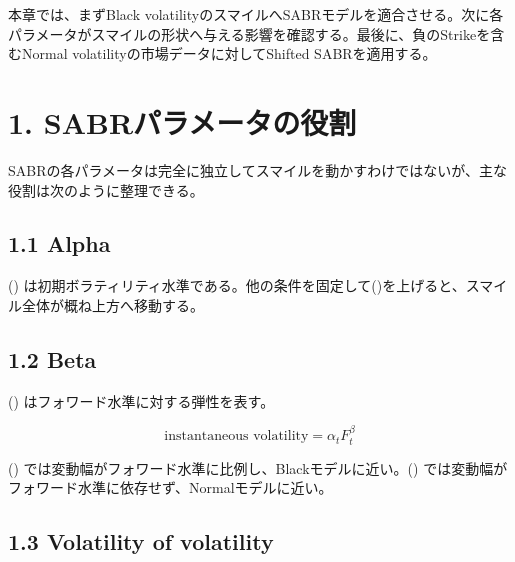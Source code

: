 \documentclass[
  letterpaper,
  DIV=11,
  numbers=noendperiod]{scrreprt}
\newenvironment{Shaded}{\begin{snugshade}}{\end{snugshade}}
\newcommand{\AttributeTok}[1]{\textcolor[rgb]{0.40,0.45,0.13}{#1}}
\newcommand{\ConstantTok}[1]{\textcolor[rgb]{0.56,0.35,0.01}{#1}}
\newcommand{\FunctionTok}[1]{\textcolor[rgb]{0.28,0.35,0.67}{#1}}
\newcommand{\NormalTok}[1]{\textcolor[rgb]{0.00,0.23,0.31}{#1}}
\newcommand{\SpecialCharTok}[1]{\textcolor[rgb]{0.37,0.37,0.37}{#1}}
\newcommand{\StringTok}[1]{\textcolor[rgb]{0.13,0.47,0.30}{#1}}
\begin{document}
本章では、まずBlack
volatilityのスマイルへSABRモデルを適合させる。次に各パラメータがスマイルの形状へ与える影響を確認する。最後に、負のStrikeを含むNormal
volatilityの市場データに対してShifted SABRを適用する。

\begin{Shaded}
\end{Shaded}

\section{1.
SABRパラメータの役割}\label{sabrux30d1ux30e9ux30e1ux30fcux30bfux306eux5f79ux5272}

SABRの各パラメータは完全に独立してスマイルを動かすわけではないが、主な役割は次のように整理できる。

\subsection{1.1 Alpha}\label{alpha}

(\alpha)
は初期ボラティリティ水準である。他の条件を固定して(\alpha)を上げると、スマイル全体が概ね上方へ移動する。

\subsection{1.2 Beta}\label{beta}

(\beta) はフォワード水準に対する弾性を表す。

\[
\text{instantaneous volatility}
=
\alpha_tF_t^\beta
\]

()
では変動幅がフォワード水準に比例し、Blackモデルに近い。()
では変動幅がフォワード水準に依存せず、Normalモデルに近い。

\subsection{1.3 Volatility of
volatility}\label{volatility-of-volatility}
\end{document}
